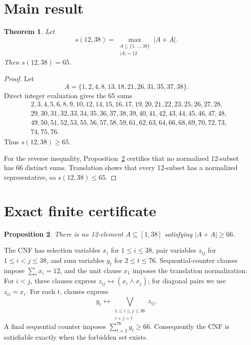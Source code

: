 \documentclass[11pt]{amsart}
\newtheorem{theorem}{Theorem}[section]
\newtheorem{proposition}[theorem]{Proposition}
\theoremstyle{definition}
\begin{document}
\section{Main result}

\begin{theorem}\label{thm:main}
Let
\[
s(12,38)=\max_{\substack{A\subseteq\{1,\ldots,38\}\\|A|=12}}|A+A|.
\]
Then \(s(12,38)=65\).
\end{theorem}

\begin{proof}
Let
\[
A=\{1,2,4,8,13,18,21,26,31,35,37,38\}.
\]
Direct integer evaluation gives the 65 sums
\begin{align*}
&2,3,4,5,6,8,9,10,12,14,15,16,17,19,20,21,22,23,25,26,27,28,\\
&29,30,31,32,33,34,35,36,37,38,39,40,41,42,43,44,45,46,47,48,\\
&49,50,51,52,53,55,56,57,58,59,61,62,63,64,66,68,69,70,72,73,\\
&74,75,76.
\end{align*}
Thus \(s(12,38)\ge65\).

For the reverse inequality, Proposition~\ref{prop:certificate} certifies that
no normalized 12-subset has 66 distinct sums.  Translation shows that every
12-subset has a normalized representative, so \(s(12,38)\le65\).
\end{proof}

\section{Exact finite certificate}

\begin{proposition}\label{prop:certificate}
There is no 12-element \(A\subseteq[1,38]\) satisfying \(|A+A|\ge66\).
\end{proposition}

The CNF has selection variables \(x_i\) for \(1\le i\le38\), pair variables
\(z_{ij}\) for \(1\le i<j\le38\), and sum variables \(y_t\) for
\(2\le t\le76\).  Sequential-counter clauses impose
\(\sum_i x_i=12\), and the unit clause \(x_1\) imposes the translation
normalization.  For \(i<j\), three clauses express
\(z_{ij}\leftrightarrow(x_i\wedge x_j)\); for diagonal pairs we use
\(z_{ii}=x_i\).  For each \(t\), clauses express
\[
y_t\longleftrightarrow\bigvee_{\substack{1\le i\le j\le38\\i+j=t}}z_{ij}.
\]
A final sequential counter imposes \(\sum_{t=2}^{76}y_t\ge66\).
Consequently the CNF is satisfiable exactly when the forbidden set exists.
\end{document}
